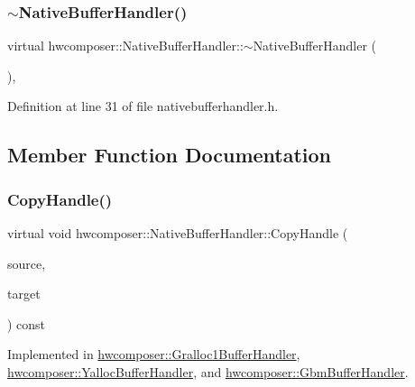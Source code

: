 \subsubsection{\texorpdfstring{$\sim$\+Native\+Buffer\+Handler()}{~NativeBufferHandler()}}
{\footnotesize\ttfamily virtual hwcomposer\+::\+Native\+Buffer\+Handler\+::$\sim$\+Native\+Buffer\+Handler (\begin{DoxyParamCaption}{ }\end{DoxyParamCaption})\hspace{0.3cm}{\ttfamily [inline]}, {\ttfamily [virtual]}}



Definition at line 31 of file nativebufferhandler.\+h.


\begin{DoxyCode}{0}
\end{DoxyCode}


\subsection{Member Function Documentation}
\mbox{\label{classhwcomposer_1_1NativeBufferHandler_a96581fb8bd36e959c8da6b9f634ecd32}} 
\subsubsection{\texorpdfstring{Copy\+Handle()}{CopyHandle()}}
{\footnotesize\ttfamily virtual void hwcomposer\+::\+Native\+Buffer\+Handler\+::\+Copy\+Handle (\begin{DoxyParamCaption}\item[{\mbox{\hyperlink{alios_2platformdefines_8h_ac0a2eaf260f556d17fe489911f017bdf}{H\+W\+C\+Native\+Handle}}}]{source,  }\item[{\mbox{\hyperlink{alios_2platformdefines_8h_ac0a2eaf260f556d17fe489911f017bdf}{H\+W\+C\+Native\+Handle}} $\ast$}]{target }\end{DoxyParamCaption}) const\hspace{0.3cm}{\ttfamily [pure virtual]}}



Implemented in \mbox{\hyperlink{classhwcomposer_1_1Gralloc1BufferHandler_a87adf9132b6567a3b167741beebcd9d3}{hwcomposer\+::\+Gralloc1\+Buffer\+Handler}}, \mbox{\hyperlink{classhwcomposer_1_1YallocBufferHandler_a25a75efa29a03adff56a37623ac6242c}{hwcomposer\+::\+Yalloc\+Buffer\+Handler}}, and \mbox{\hyperlink{classhwcomposer_1_1GbmBufferHandler_ae730a1b13a177dcf02084c0c60bcafb6}{hwcomposer\+::\+Gbm\+Buffer\+Handler}}.

